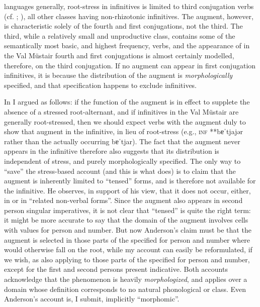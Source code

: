 \documentclass[output=paper,
modfonts
]{LSP/langsci}
\begin{document}
languages generally, root-stress in infinitives is limited to third
conjugation verbs (cf. \citealt[201f.]{maiden2011c}; \citeyear[509]{maiden2016}), all other classes
having non-rhizotonic infinitives. The augment, however, is
characteristic solely of the fourth and first conjugations, not the
third. The third, while a relatively small and unproductive class,
contains some of the semantically most basic, and highest frequency,
verbs, and the appearance of   in the Val Müstair fourth and
first conjugations is almost certainly modelled, therefore, on the third
conjugation. If no augment can appear in first conjugation infinitives,
it is because the distribution of the augment is \emph{morphologically}
specified, and that specification happens to exclude infinitives.

In \citet{maiden2011a} I argued as follows: if the function of the augment is
in effect to supplete the absence of a stressed root-alternant, and if
infinitives in the Val Müstair are generally root-stressed, then we
should expect verbs with the augment duly to show that augment in the
infinitive, in lieu of root-stress (e.g., \textsc{inf} **bɐˈtjajər
rather than the actually occurring bɐˈtjar). The fact that the augment
never appears in the infinitive therefore also suggests that its
distribution is independent of stress, and purely morphologically
specified. The only way to ``save'' the stress-based account (and this is
what \citealt{anderson2013stem} does) is to claim that the augment is inherently
limited to ``tensed'' forms, and is therefore not available for the
infinitive. He observes, in support of his view, that it does not occur,
either, in  or in ``related non-verbal forms''. Since the
augment also appears in second person singular imperatives, it is not
clear that ``tensed'' is quite the right term: it might be more accurate
to say that the domain of the augment involves cells with values for
person and number. But now Anderson's claim must be that the augment is
selected in those parts of the  specified for person and number
where  would otherwise fall on the root, while my account can
easily be reformulated, if we wish, as also applying to those parts of
the  specified for person and number, except for the first and
second persons  present indicative. Both accounts acknowledge that
the phenomenon is heavily \emph{morphologized}, and applies over a
domain whose definition corresponds to no natural phonological or
 class. Even Anderson's account is, I submit, implicitly
``morphomic''.
\end{document}
